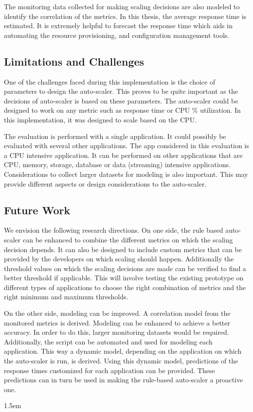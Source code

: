 \documentclass[article,type=msc,colorback,12pt,accentcolor=tud8b,table]{tudthesis}
\begin{document}
The monitoring data collected for making scaling decisions are also modeled to identify the correlation of the metrics. In this thesis, the average response time is estimated. It is extremely helpful to forecast the response time which aids in automating the resource provisioning, and configuration management tools. 

 \subsection{Limitations and Challenges}	
 
 One of the challenges faced during this implementation is the choice of parameters to design the auto-scaler. This proves to be quite important as the decisions of auto-scaler is based on these parameters. The auto-scaler could be designed to work on any metric such as response time or CPU \% utilization. In this implementation, it was designed to scale based on the CPU. 
 
 The evaluation is performed with a single application. It could possibly be evaluated with several other applications. The app considered in this evaluation is a CPU intensive application. It can be performed on other applications that are CPU, memory, storage, database or data (streaming) intensive applications. Considerations to collect larger datasets for modeling is also important. This may provide different aspects or design considerations to the auto-scaler.
 
 
\subsection{Future Work}

We envision the following research directions. On one side, the rule based auto-scaler can be enhanced to combine the different metrics on which the scaling decision depends. It can also be designed to include custom metrics that can be provided by the developers on which scaling should happen. Additionally the threshold values on which the scaling decisions are made can be verified to find a better threshold if applicable. This will involve testing the existing prototype on different types of applications to choose the right combination of metrics and the right minimum and maximum thresholds. 

On the other side, modeling can be improved. A correlation model from the monitored metrics is derived. Modeling can be enhanced to achieve a better accuracy. In order to do this, larger monitoring datasets would be required. Additionally, the script can be automated and used for modeling each application. This way a dynamic model, depending on the application on which the auto-scaler is run, is derived. Using this dynamic model, predictions of the response times customized for each application can be provided. These predictions can in turn be used in making the rule-based auto-scaler a proactive one. 

\clearpage
 \hfill  

\emergencystretch 1.5em

	  

\clearpage

\printglossary
\clearpage
\end{document}

